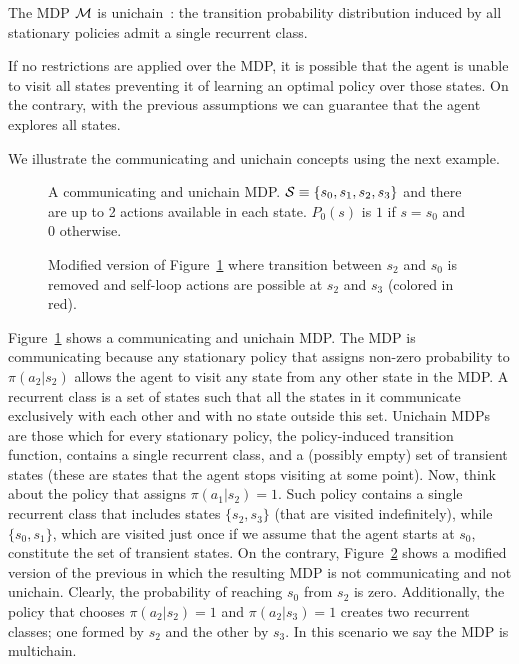 \begin{assumption}
  The MDP $\mathcal{M}$ is unichain~\citep{Puterman1994}: the transition probability distribution induced by all stationary policies admit a single recurrent class.
  \label{ass:mdp_unichain}
\end{assumption}

If no restrictions are applied over the MDP, it is possible that the agent is unable to visit all states preventing it of learning an optimal policy over those states. On the contrary, with the previous assumptions we can guarantee that the agent explores all states. 

We illustrate the communicating and unichain concepts using the next example. 
\begin{figure}[!h]
  \centering
  
  \caption{A communicating and unichain MDP. $\mathcal{S}\equiv\{s_0, s_1, s_2, s_3\}$ and there are up to 2 actions available in each state. $P_0(s)$ is $1$ if $s=s_0$ and $0$ otherwise.}
  \label{fig:unichain}
\end{figure}
\begin{figure}[!h]
\centering

\caption{Modified version of Figure~\ref{fig:unichain} where transition between $s_2$ and $s_0$ is removed and self-loop actions are possible at $s_2$ and $s_3$ (colored in red).}
\label{fig:multichain}
\end{figure}
\begin{example}[Example 1]
Figure~\ref{fig:unichain} shows a communicating and unichain MDP. The MDP is communicating because any stationary policy that assigns non-zero probability to $\pi(a_2\lvert s_2)$ allows the agent to visit any state from any other state in the MDP. A recurrent class is a set of states such that all the states in it communicate exclusively with each other and with no state outside this set. Unichain MDPs are those which for every stationary policy, the policy-induced transition  function, contains a single recurrent class, and a (possibly empty) set of transient states (these are states that the agent stops visiting at some point). Now, think about the policy that assigns $\pi(a_1\lvert s_2)=1$. Such policy contains a single recurrent class that includes states $\{s_2, s_3\}$ (that are visited indefinitely), while $\{s_0, s_1\}$, which are visited just once if we assume that the agent starts at $s_0$, constitute the set of transient states. On the contrary, Figure~\ref{fig:multichain} shows a modified version of the previous in which the resulting MDP is not communicating and not unichain. Clearly, the probability of reaching $s_0$ from $s_2$ is zero. Additionally, the policy that chooses $\pi(a_2\lvert s_2)=1$ and $\pi(a_2\lvert s_3)=1$ creates two recurrent classes; one formed by $s_2$ and the other by $s_3$. In this scenario we say the MDP is multichain.
\end{example}

